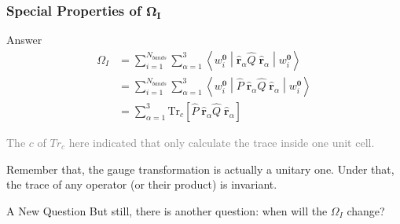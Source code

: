 \documentclass{beamer}
\begin{document}
  \begin{frame}
    \frametitle{Special Properties of \(\mathbf{\Omega_I}\)}

    \begin{block}{Answer}
      \small
      \begin{equation*}
        \begin{aligned}
          \Omega_I &= \sum_{i=1}^{N_{bands}}\sum_{\alpha=1}^3\left\langle{}w_i^{\mathbf{0}}\middle|\widehat{\mathbf{r}}_\alpha\widehat{Q}\;\widehat{\mathbf{r}}_\alpha\middle|{}w_i^\mathbf{0}\right\rangle\\
          &= \sum_{i=1}^{N_{bands}}\sum_{\alpha=1}^3\left\langle{}w_i^{\mathbf{0}}\middle|\widehat{P}\;\widehat{\mathbf{r}}_\alpha\widehat{Q}\;\widehat{\mathbf{r}}_\alpha\middle|{}w_i^\mathbf{0}\right\rangle\\
          &= \sum_{\alpha=1}^3\mathrm{Tr}_c\left[\widehat{P}\;\widehat{\mathbf{r}}_\alpha\widehat{Q}\;\widehat{\mathbf{r}}_\alpha\right]
        \end{aligned}
      \end{equation*} 

      \textcolor{gray}{The \(c\) of \(Tr_c\) here indicated that only calculate the trace inside one unit cell.}

      Remember that, the gauge transformation is actually a unitary one. Under that, the trace of any operator (or their product) is invariant. 
    \end{block}

    \begin{alertblock}{A New Question}
      But still, there is another question: when will the \(\Omega_I\) change?
    \end{alertblock}

  \end{frame}
\end{document}
